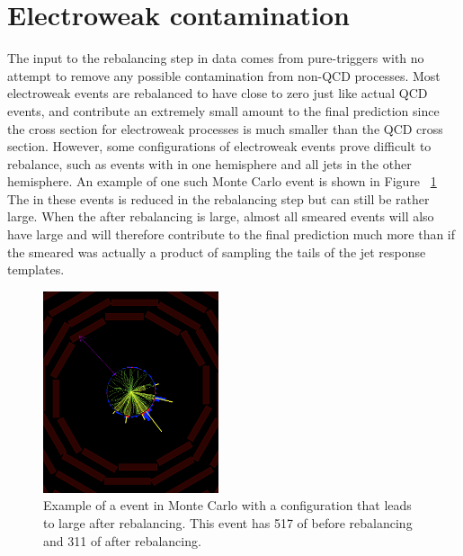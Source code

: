 \clearpage
\section{Electroweak contamination}
The input to the rebalancing step in data comes from pure-\Ht triggers with no attempt to remove any possible contamination from non-QCD processes. Most electroweak events
are rebalanced to have \ptmiss close to zero just like actual QCD events, and contribute an extremely small amount to the final prediction since the cross section for electroweak processes
is much smaller than the QCD cross section. However, some configurations of electroweak events prove difficult to rebalance, such as events with \ptmiss in one hemisphere and all
jets in the other hemisphere. An example of one such Monte Carlo event is shown in Figure ~\ref{Fig:rs_ewk_zinv_event} The \ptmiss in these events is reduced in the rebalancing step
but can still be rather large. When the \ptmiss after rebalancing is large, almost all smeared events will also have large \ptmiss and will therefore contribute to the final prediction
much more than if the smeared \ptmiss was actually a product of sampling the tails of the jet response templates.

\begin{figure}[htbp]
  \begin{center}
    \includegraphics[width=0.46\textwidth]{figs/qcd/rs_mc/ewk/zinv_ht400to600_met500_njet6.png}
    \caption{Example of a \znunu event in Monte Carlo with a configuration that leads to large \ptmiss after rebalancing.
             This event has 517 \GeV of \ptmiss before rebalancing and 311 \GeV of \ptmiss after rebalancing.
            }
    \label{Fig:rs_ewk_zinv_event}
  \end{center}
\end{figure}

